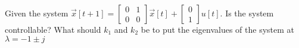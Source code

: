 \begin{enumerate}











\qitem Given the system  $\vec{x}[t+1] = \begin{bmatrix} 0 & 1 \\ 0 & 0 \end{bmatrix} \vec{x}[t] + \begin{bmatrix} 0 \\ 1 \end{bmatrix} u[t]$. Is the system controllable? What should $k_1$ and $k_2$ be to put the eigenvalues of the system at $\lambda = -1 \pm j$


\end{enumerate}
